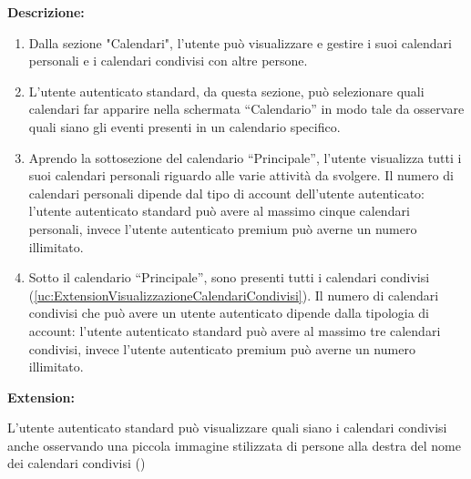\begin{listaPersonale}[UC]{}
    \textbf{Descrizione:}
    \begin{enumerate}
        \item Dalla sezione "Calendari", l'utente può visualizzare e gestire i suoi calendari personali e i calendari condivisi con altre persone.
        \item L'utente autenticato standard, da questa sezione, può selezionare quali calendari far apparire nella schermata “Calendario” in modo tale da osservare quali siano gli eventi presenti in un calendario specifico.
        \item Aprendo la sottosezione del calendario “Principale”, l'utente visualizza tutti i suoi calendari personali riguardo alle varie attività da svolgere. Il numero di calendari personali dipende dal tipo di account dell'utente autenticato: l'utente autenticato standard può avere al massimo cinque calendari personali, invece l'utente autenticato premium può averne un numero illimitato.
        \item Sotto il calendario “Principale”, sono presenti tutti i calendari condivisi (\ref{uc:ExtensionVisualizzazioneCalendariCondivisi}). Il numero di calendari condivisi che può avere un utente autenticato dipende dalla tipologia di account: l'utente autenticato standard può avere al massimo tre calendari condivisi, invece l'utente autenticato premium può averne un numero illimitato.
    \end{enumerate}


    \textbf{Extension:}
    \begin{enumerate}[label=\textbf{[extension \arabic{enumii}]}, ref= \textbf{[extension \arabic{enumii}]}]
         L'utente autenticato standard può visualizzare quali siano i calendari condivisi anche osservando una piccola immagine stilizzata di persone alla destra del nome dei calendari condivisi ()
    \end{enumerate}




    \newpage


\end{listaPersonale}
